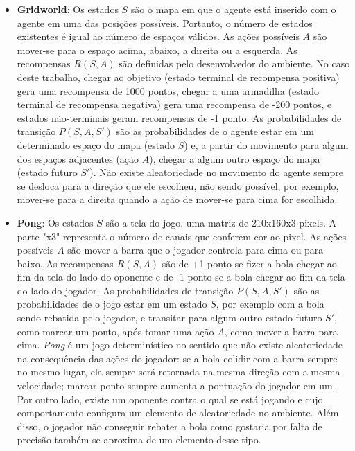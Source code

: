 \begin{itemize}
\item \textbf{Gridworld}:
Os estados $S$ são o mapa em que o agente está inserido com o agente em uma das posições possíveis.
Portanto, o número de estados existentes é igual ao número de espaços válidos.
As ações possíveis $A$ são mover-se para o espaço acima, abaixo, a direita ou a esquerda.
As recompensas $R(S,A)$ são definidas pelo desenvolvedor do ambiente.
No caso deste trabalho, chegar ao objetivo (estado terminal de recompensa positiva) gera uma recompensa de 1000 pontos, chegar a uma armadilha (estado terminal de recompensa negativa) gera uma recompensa de -200 pontos, e estados não-terminais geram recompensas de -1 ponto.
As probabilidades de transição $P(S,A,S')$ são as probabilidades de o agente estar em um determinado espaço do mapa (estado $S$) e, a partir do movimento para algum dos espaços adjacentes (ação $A$), chegar a algum outro espaço do mapa (estado futuro $S'$).
Não existe aleatoriedade no movimento do agente sempre se desloca para a direção que ele escolheu, não sendo possível, por exemplo, mover-se para a direita quando a ação de mover-se para cima for escolhida.

\item \textbf{Pong}:
Os estados $S$ são a tela do jogo, uma matriz de 210x160x3 pixels.
A parte "x3"{} representa o número de canais que conferem cor ao pixel.
As ações possíveis $A$ são mover a barra que o jogador controla para cima ou para baixo.
As recompensas $R(S,A)$ são de +1 ponto se fizer a bola chegar ao fim da tela do lado do oponente e de -1 ponto se a bola chegar ao fim da tela do lado do jogador.
As probabilidades de transição $P(S,A,S')$ são as probabilidades de o jogo estar em um estado $S$, por exemplo com a bola sendo rebatida pelo jogador, e transitar para algum outro estado futuro $S'$, como marcar um ponto, após tomar uma ação $A$, como mover a barra para cima.
\textit{Pong} é um jogo determinístico no sentido que não existe aleatoriedade na consequência das ações do jogador: se a bola colidir com a barra sempre no mesmo lugar, ela sempre será retornada na mesma direção com a mesma velocidade; marcar ponto sempre aumenta a pontuação do jogador em um.
Por outro lado, existe um oponente contra o qual se está jogando e cujo comportamento configura um elemento de aleatoriedade no ambiente.
Além disso, o jogador não conseguir rebater a bola como gostaria por falta de precisão também se aproxima de um elemento desse tipo.


\end{itemize}

